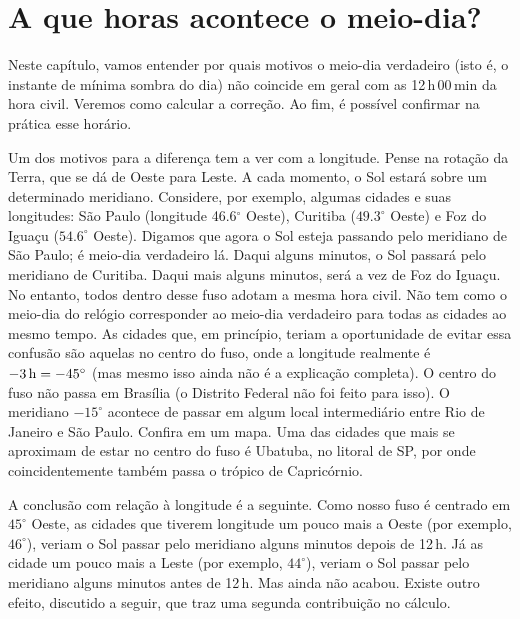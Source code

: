 \chapter{A que horas acontece o meio-dia?}

Neste capítulo, vamos entender por quais motivos o meio-dia verdadeiro (isto é, o instante de mínima sombra do dia) não coincide em geral com as 12\,h\,00\,min da hora civil. Veremos como calcular a correção. Ao fim, é possível confirmar na prática esse horário.

Um dos motivos para a diferença tem a ver com a longitude. Pense na rotação da Terra, que se dá de Oeste para Leste. A cada momento, o Sol estará sobre um determinado meridiano. Considere, por exemplo, algumas cidades e suas longitudes: São Paulo (longitude 46.6$^{\circ}$ Oeste), Curitiba ($49.3^{\circ}$ Oeste) e Foz do Iguaçu ($54.6^{\circ}$ Oeste). Digamos que agora o Sol esteja passando pelo meridiano de São Paulo; é meio-dia verdadeiro lá. Daqui alguns minutos, o Sol passará pelo meridiano de Curitiba. Daqui mais alguns minutos, será a vez de Foz do Iguaçu. No entanto, todos dentro desse fuso adotam a mesma hora civil. Não tem como o meio-dia do relógio corresponder ao meio-dia verdadeiro para todas as cidades ao mesmo tempo. As cidades que, em princípio, teriam a oportunidade de evitar essa confusão são aquelas no centro do fuso, onde a longitude realmente é $-3\,{\rm h} = -45^{\circ}$ (mas mesmo isso ainda não é a explicação completa). O centro do fuso não passa em Brasília (o Distrito Federal não foi feito para isso). O meridiano $-15^{\circ}$ acontece de passar em algum local intermediário entre Rio de Janeiro e São Paulo. Confira em um mapa. Uma das cidades que mais se aproximam de estar no centro do fuso é Ubatuba, no litoral de SP, por onde coincidentemente também passa o trópico de Capricórnio.

A conclusão com relação à longitude é a seguinte. Como nosso fuso é centrado em $45^{\circ}$ Oeste, as cidades que tiverem longitude um pouco mais a Oeste (por exemplo, $46^{\circ}$), veriam o Sol passar pelo meridiano alguns minutos depois de 12\,h. Já as cidade um pouco mais a Leste (por exemplo, $44^{\circ}$), veriam o Sol passar pelo meridiano alguns minutos antes de 12\,h. Mas ainda não acabou. Existe outro efeito, discutido a seguir, que traz uma segunda contribuição no cálculo.


